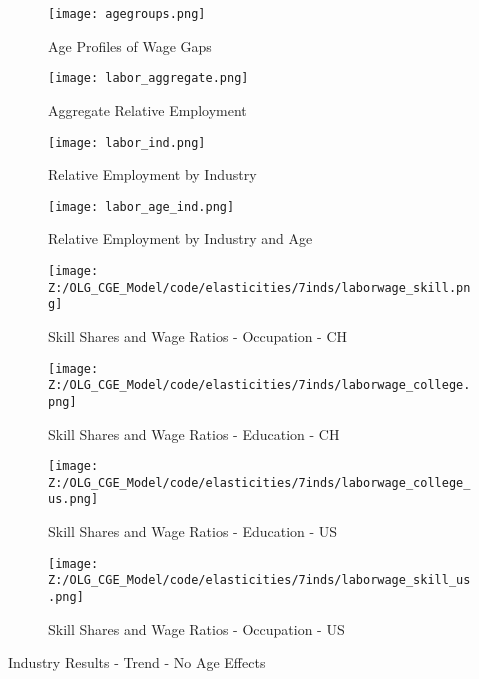 \documentclass[]{article}
\begin{document}
\begin{figure}[H]
  \centering
  \texttt{[image: agegroups.png]}
  \caption{Age Profiles of Wage Gaps}
  \label{fig:gap_age}
\end{figure}

\begin{figure}[H]
  \centering
  \texttt{[image: labor\_aggregate.png]}
  \caption{Aggregate Relative Employment}
  \label{fig:labor_aggregate}
\end{figure}

\begin{figure}[H]
  \centering
  \texttt{[image: labor\_ind.png]}
  \caption{Relative Employment by Industry}
  \label{fig:labor_ind}
\end{figure}

\begin{figure}[H]
  \centering
  \texttt{[image: labor\_age\_ind.png]}
  \caption{Relative Employment by Industry and Age}
  \label{fig:labor_age_ind}
\end{figure}


\begin{figure}[H]
  \centering
  \texttt{[image: Z:/OLG\_CGE\_Model/code/elasticities/7inds/laborwage\_skill.png]}
  \caption{Skill Shares and Wage Ratios - Occupation - CH}
  \label{fig:shares_ind1}
\end{figure}

\begin{figure}[H]
  \centering
  \texttt{[image: Z:/OLG\_CGE\_Model/code/elasticities/7inds/laborwage\_college.png]}
  \caption{Skill Shares and Wage Ratios - Education - CH}
  \label{fig:shares_ind2}
\end{figure}

\begin{figure}[H]
  \centering
  \texttt{[image: Z:/OLG\_CGE\_Model/code/elasticities/7inds/laborwage\_college\_us.png]}
  \caption{Skill Shares and Wage Ratios - Education - US}
  \label{fig:shares_ind3}
\end{figure}

\begin{figure}[H]
  \centering
  \texttt{[image: Z:/OLG\_CGE\_Model/code/elasticities/7inds/laborwage\_skill\_us.png]}
  \caption{Skill Shares and Wage Ratios - Occupation - US}
  \label{fig:shares_ind4}
\end{figure}

\begin{table}[H]
  \centering
  \caption{Industry Results - Trend - No Age Effects}
  
   \label{indresults_trend_noage}
\end{table}%
\end{document}
